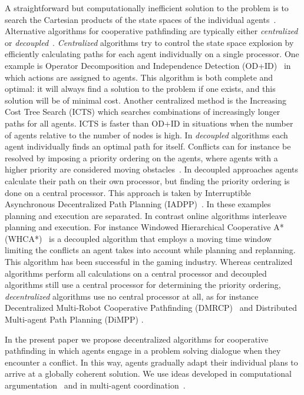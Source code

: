 A straightforward but computationally inefficient solution to the problem is to 
search the Cartesian products of the state spaces of the individual 
agents~\cite{hopcroft1984}. Alternative algorithms for cooperative pathfinding 
are typically either \emph{centralized} or \emph{decoupled}~\cite{latombe1991}.
\emph{Centralized} algorithms try to control the state space explosion by 
efficiently calculating paths for each agent individually on a single 
processor. One example is Operator Decomposition and Independence Detection 
(OD+ID)~\cite{standley2010,standley2011} in which actions are assigned to agents. 
This algorithm is both complete and 
optimal: it will always find a solution to the problem if one exists, and this 
solution will be of minimal cost.
Another centralized method is the Increasing Cost Tree 
Search (ICTS) \cite{sharon2013} which searches combinations of increasingly 
longer paths for all agents. ICTS is faster than OD+ID in situations when the 
number of agents relative to the number of nodes is high.
In \emph{decoupled} algorithms each agent individually finds an optimal path 
for itself. Conflicts can for instance be resolved by imposing a priority 
ordering on the agents, where agents with a higher priority are considered 
moving obstacles~\cite{bennewitz2002}.
In decoupled approaches agents calculate their path on their own processor, but finding the priority ordering is done on a central 
processor. This 
approach is taken by Interruptible Asynchronous Decentralized Path Planning 
(IADPP)~\cite{cap2012}.
In these examples planning and execution are separated. In contrast online algorithms 
interleave planning and execution. For instance Windowed Hierarchical Cooperative A* 
(WHCA*)~\cite{silver2005} is a decoupled algorithm that employs a moving time window limiting the 
conflicts an agent takes into account while planning and replanning. This 
algorithm has been successful in the gaming industry.
Whereas centralized algorithms perform all calculations on a central processor and decoupled algorithms still use a central processor for determining the priority ordering, \emph{decentralized} algorithms use no central processor at all, as for instance Decentralized 
Multi-Robot Cooperative Pathfinding (DMRCP)~\cite{wei2016} and Distributed 
Multi-agent Path Planning (DiMPP) \cite{chouhan2017}.

In the present paper we propose decentralized algorithms for cooperative 
pathfinding in which agents engage in a problem solving dialogue when they 
encounter a conflict. In this way, agents gradually adapt their individual 
plans to arrive at a globally coherent solution. We use ideas developed in 
computational argumentation~\cite{rahwanSimari2009} and in multi-agent 
coordination~\cite[pp.~202--204]{wooldridge2009}.

